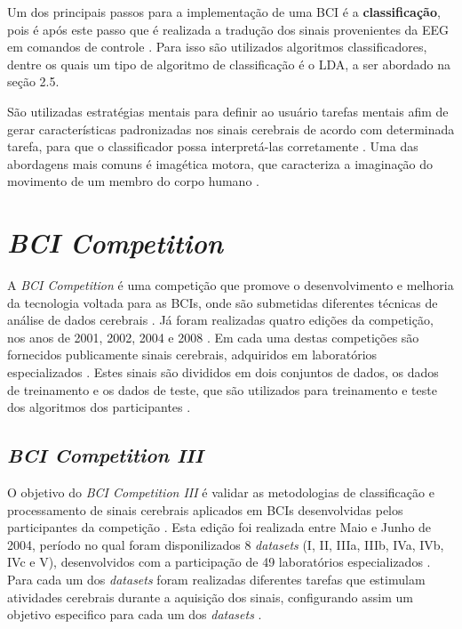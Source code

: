 Um dos principais passos para a implementação de uma
BCI é a \textbf{classificação}, pois é após este passo que é realizada a tradução dos sinais provenientes da EEG
em comandos de controle \cite{MasonAndBirch}. Para isso são utilizados algoritmos classificadores, dentre os quais um tipo de algoritmo de classificação é o LDA, a ser abordado na seção 2.5.

São utilizadas estratégias mentais para definir ao usuário tarefas mentais afim de gerar características padronizadas nos sinais cerebrais de acordo com determinada tarefa, para que o classificador possa interpretá-las corretamente \cite{SIULYDissertacao}. Uma das abordagens mais comuns é imagética motora, que caracteriza a imaginação do movimento de um membro do corpo humano \cite{SIULYDissertacao}.  

\section{\textit{BCI Competition}}
A \textit{BCI Competition} é uma competição que promove o desenvolvimento e melhoria da tecnologia voltada para as BCIs, onde são submetidas diferentes técnicas de análise de dados cerebrais \cite{BCICompetition}. Já foram realizadas quatro edições da competição, nos anos de 2001, 2002, 2004 e 2008 \cite{BCICompetition}. Em cada uma destas competições são fornecidos publicamente sinais cerebrais, adquiridos em laboratórios especializados \cite{BCICompetition}. Estes sinais são divididos em dois conjuntos de dados, os dados de treinamento e os dados de teste, que são utilizados para treinamento e teste dos algoritmos dos participantes \cite{BCICompetition}.

\subsection{\textit{BCI Competition III}}
O objetivo do \textit{BCI Competition III} é validar as metodologias de classificação e processamento de sinais cerebrais aplicados em BCIs desenvolvidas pelos participantes da competição \cite{siteBCI}. Esta edição foi realizada entre Maio e Junho de 2004, período no qual foram disponilizados 8 \textit{datasets} (I, II, IIIa, IIIb, IVa, IVb, IVc e V), desenvolvidos com a participação de 49 laboratórios especializados \cite{BCICompetition}.
Para cada um dos \textit{datasets} foram realizadas diferentes tarefas que estimulam atividades cerebrais durante a aquisição dos sinais, configurando assim um objetivo especifico para cada um dos \textit{datasets} \cite{siteBCI}.

